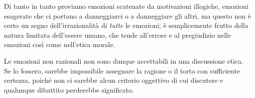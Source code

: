 Di tanto in tanto proviamo emozioni scatenate da motivazioni illogiche, emozioni esagerate che ci
portano a danneggiarci o a danneggiare gli altri, ma questo non è certo un segno dell'irrazionalità
di \emph{tutte} le emozioni; è semplicemente frutto della natura limitata dell'essere umano, che
tende all'errore e al pregiudizio nelle emozioni così come nell'etica morale.

Le emozioni non razionali non sono dunque accettabili in una discussione etica. Se lo fossero,
sarebbe impossibile assegnare la ragione o il torto con sufficiente certezza, poiché non ci sarebbe
alcun criterio oggettivo di cui discutere e qualunque dibattito perderebbe significato.
